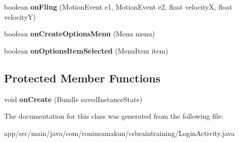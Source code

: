 \begin{DoxyCompactItemize}
\item 
boolean {\bfseries on\+Fling} (Motion\+Event e1, Motion\+Event e2, float velocity\+X, float velocity\+Y)\label{classcom_1_1roninsamakun_1_1csbraintraining_1_1_login_activity_a145dfb69e5807e44f15db838201aa019}

\item 
boolean {\bfseries on\+Create\+Options\+Menu} (Menu menu)\label{classcom_1_1roninsamakun_1_1csbraintraining_1_1_login_activity_af65c805e126fdbf59b5ea35ec55995fc}

\item 
boolean {\bfseries on\+Options\+Item\+Selected} (Menu\+Item item)\label{classcom_1_1roninsamakun_1_1csbraintraining_1_1_login_activity_a85aa97ffd9ed6c8012fcdcbe10053a5d}

\end{DoxyCompactItemize}
\subsection*{Protected Member Functions}
\begin{DoxyCompactItemize}
\item 
void {\bfseries on\+Create} (Bundle saved\+Instance\+State)\label{classcom_1_1roninsamakun_1_1csbraintraining_1_1_login_activity_aa158c1526458d28d8ebb8ecfa9d111f4}

\end{DoxyCompactItemize}


The documentation for this class was generated from the following file\+:\begin{DoxyCompactItemize}
\item 
app/src/main/java/com/roninsamakun/csbraintraining/Login\+Activity.\+java\end{DoxyCompactItemize}
